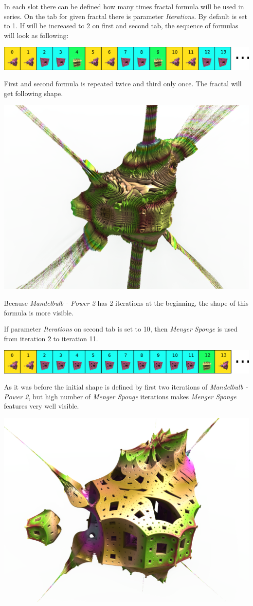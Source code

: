 In each slot there can be defined how many times fractal formula will be used in series. 
On the tab for given fractal there is parameter \emph{Iterations}. By default is set to 1. If will be increased to 2 on first and second tab, the sequence of formulas will look as following:\label{two-iterations-per-slot}

\includegraphics[width=\linewidth]{img/manual/media/iteration_loop_hybrid_sequence_2.png}

First and second formula is repeated twice and third only once. 
The fractal will get following shape.

\includegraphics[width=0.7\linewidth]{img/manual/media/hybrid_sequence_example_2.png}

Because \emph{Mandelbulb - Power 2} has 2 iterations at the beginning, the shape of this formula is more visible.

If parameter \emph{Iterations} on second tab is set to 10, then \emph{Menger Sponge} is used from iteration 2 to iteration 11.

\includegraphics[width=\linewidth]{img/manual/media/iteration_loop_hybrid_sequence_3.png}

As it was before the initial shape is defined by first two iterations of \emph{Mandelbulb - Power 2}, but high number of \emph{Menger Sponge} iterations makes \emph{Menger Sponge} features very well visible.

\includegraphics[width=0.7\linewidth]{img/manual/media/hybrid_sequence_example_3.png}

